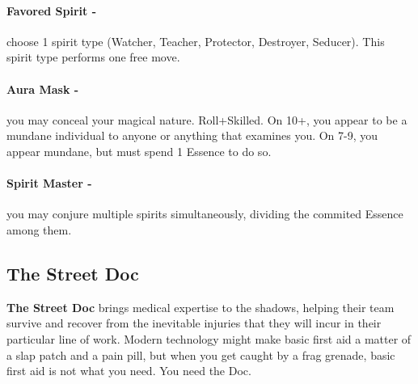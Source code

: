 \paragraph{Favored Spirit -} choose 1 spirit type (Watcher, Teacher, Protector, Destroyer, Seducer). This spirit type performs one free move.

\paragraph{Aura Mask -} you may conceal your magical nature. Roll+Skilled. On 10+, you appear to be a mundane individual to anyone or anything that examines you. On 7-9, you appear mundane, but must spend 1 Essence to do so.

\paragraph{Spirit Master -} you may conjure multiple spirits simultaneously, dividing the commited Essence among them.



\clearpage
\subsection{The Street Doc}
\textbf{The Street Doc} brings medical expertise to the shadows, helping their team survive and recover from the inevitable injuries that they will incur in their particular line of work. Modern technology might make basic first aid a matter of a slap patch and a pain pill, but when you get caught by a frag grenade, basic first aid is not what you need. You need the Doc.

